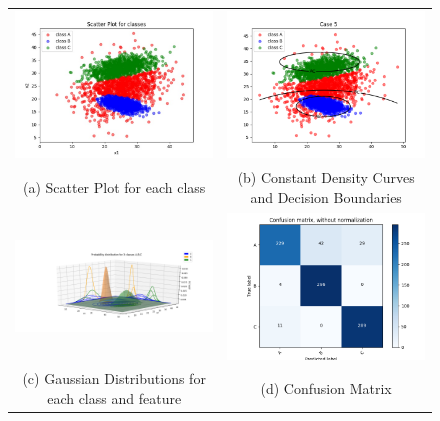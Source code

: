 \begin{figure}[H]
	\hspace*{-2cm}\begin{tabular}{cc}
		\includegraphics[width=70mm]{./dataset2/scatter.jpeg} &   \includegraphics[width=70mm]{./dataset2/decisio.png} \\
		(a) Scatter Plot for each class & (b) Constant Density Curves and Decision Boundaries\\[4pt]
		
		\includegraphics[width=70mm]{./dataset2/PDF.png} &   \includegraphics[width=70mm]{./dataset2/confusionMatrix.png} \\
		(c) Gaussian Distributions for each class and feature & (d) Confusion Matrix \\[4pt]
		

\end{tabular}
\end{figure}
